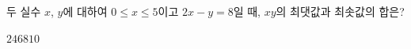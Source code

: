 두 실수 $x$, $y$에 대하여 $0\le x\le 5$이고 $2x-y=8$일 때, $xy$의 최댓값과 최솟값의 합은?
\begin{choices32}{$2$}{$4$}{$6$}{$8$}{$10$}\end{choices32}
